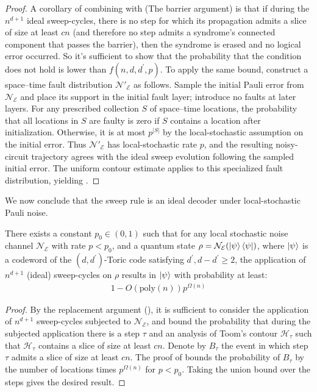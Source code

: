 \begin{proof} 
A corollary of combining  with  (The barrier argument) is that if during the $n^{d+1}$ ideal sweep-cycles, there is no step for which its propagation admits a slice of size at least $cn$ (and therefore no step admits a syndrome's connected component that passes the barrier), then the syndrome is erased and no logical error occurred. So it's sufficient to show that the probability that the condition does not hold is lower than $f(n,d,d^{\prime},p)$. To apply the same bound, construct a space--time fault distribution
$\mathcal N'_{\mathcal E}$ as follows. Sample the initial Pauli error from
$\mathcal N_{\mathcal E}$ and place its support in the initial fault layer;
introduce no faults at later layers. For any prescribed collection $S$ of
space--time locations, the probability that all locations in $S$ are faulty
is zero if $S$ contains a location after initialization. Otherwise, it is at
most $p^{|S|}$ by the local-stochastic assumption on the initial error.
Thus $\mathcal N'_{\mathcal E}$ has local-stochastic rate $p$, and the resulting
noisy-circuit trajectory agrees with the ideal sweep evolution following the
sampled initial error. The uniform contour estimate applies to this specialized
fault distribution, yielding .
\end{proof}
We now conclude that the sweep rule is an ideal decoder under local-stochastic Pauli noise.
  \begin{theorem}
    \label{theorem:idealdec}
    There exists a constant $p_{0} \in (0,1)$ such that for any local stochastic noise channel $\mathcal{N}_{\mathcal{E}}$ with rate $p < p_{0}$, and a quantum state $\rho = \mathcal{N}_{\mathcal{E}}(\ket{\psi}\bra{\psi} )$, where $\ket{\psi}$ is a codeword of the $(d,d^{\prime})$-Toric code satisfying $d^{\prime},d-d^{\prime}\ge 2$, the application of $n^{d+1}$ (ideal) sweep-cycles on $\rho$ results in $\ket{\psi}$ with probability at least:
\begin{equation*}
  \begin{split}
    1 -   O \left( \text{poly}(n) \right)  p^{\Omega(n)} 
  \end{split}
\end{equation*}
  \end{theorem} 
  \begin{proof}
    By the replacement argument (), it is sufficient to consider the application of $n^{d+1}$ sweep-cycles subjected to $\mathcal{N}_{\mathcal{E}}$, and bound the probability that during the subjected application there is a step $\tau$ and an analysis of Toom's contour $\mathcal{H}_{\tau}$ such that $\mathcal{H}_{\tau}$ contains a slice of size at least $cn$. Denote by $B_{\tau}$ the event in which step $\tau$ admits a slice of size at least $cn$. The proof of  bounds the probability of $B_{\tau}$ by the number of locations times $p^{\Omega(n)}$ for $p < p_{0}$. Taking the union bound over the steps gives the desired result.
  \end{proof}






